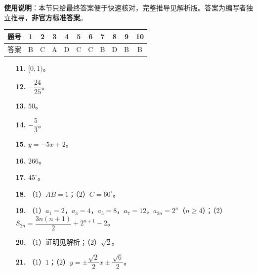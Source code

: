 
\begin{gknotice}
\textbf{使用说明}：本节只给最终答案便于快速核对，完整推导见解析版。答案为编写者独立推导，\textbf{非官方标准答案}。
\end{gknotice}

\begin{center}\begin{tabular}{ccccccccccc}
\toprule
题号 & 1 & 2 & 3 & 4 & 5 & 6 & 7 & 8 & 9 & 10 \\
\midrule
答案 & B & C & A & D & C & C & B & D & B & B \\
\bottomrule
\end{tabular}\end{center}

\begin{itemize}[leftmargin=2.6em]
  \item[\textbf{11.}] $[0,1)$。
  \item[\textbf{12.}] $-\dfrac{24}{25}$。
  \item[\textbf{13.}] $50$。
  \item[\textbf{14.}] $-\dfrac53$。
  \item[\textbf{15.}] $y=-5x+2$。
  \item[\textbf{16.}] $266$。
  \item[\textbf{17.}] $45^\circ$。
\end{itemize}

\begin{itemize}[leftmargin=2.6em]
  \item[\textbf{18.}] （1）$AB=1$；（2）$C=60^\circ$。
  \item[\textbf{19.}] （1）$a_1=2$，$a_3=4$，$a_5=8$，$a_7=12$，$a_{2n}=2^n$（$n\geqslant4$）；（2）$S_{2n}=\dfrac{3n(n+1)}2+2^{n+1}-2$。
  \item[\textbf{20.}] （1）证明见解析；（2）$\sqrt2$。
  \item[\textbf{21.}] （1）$1$；（2）$y=\pm\dfrac{\sqrt2}{2}x\pm\dfrac{\sqrt6}{2}$。
\end{itemize}
